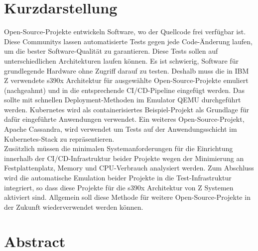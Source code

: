 \thispagestyle{empty}
\section*{Kurzdarstellung}
\label{sec:kurzdarstellung}
Open-Source-Projekte entwickeln Software, wo der Quellcode frei verfügbar ist. Diese Communitys lassen automatisierte Tests gegen jede Code-Änderung laufen, um die bester Software-Qualität zu garantieren. 
Diese Tests sollen auf unterschiedlichen Architekturen laufen können. Es ist schwierig, Software für grundlegende Hardware ohne Zugriff darauf zu testen. Deshalb muss die in IBM Z verwendete s390x Architektur für ausgewählte Open-Source-Projekte emuliert (nachgeahmt) und in die entsprechende CI/CD-Pipeline eingefügt werden. 
Das sollte mit schnellen Deployment-Methoden im Emulator QEMU durchgeführt werden. 
Kubernetes wird als containerisiertes Beispiel-Projekt als Grundlage für dafür eingeführte Anwendungen verwendet. Ein weiteres Open-Source-Projekt, Apache Cassandra, wird verwendet um Tests auf der Anwendungsschicht im Kubernetes-Stack zu repräsentieren. \\
Zusätzlich müssen die minimalen Systemanforderungen für die Einrichtung innerhalb der CI/CD-Infrastruktur beider Projekte wegen der Minimierung an Festplattenplatz, Memory und CPU-Verbrauch analysiert werden. Zum Abschluss wird die automatische Emulation beider Projekte in die Test-Infrastruktur integriert, so dass diese Projekte für die s390x Architektur von Z Systemen aktiviert sind. Allgemein soll diese Methode für weitere Open-Source-Projekte in der Zukunft wiederverwendet werden können.



\section*{Abstract}
\label{sec:abstract}

